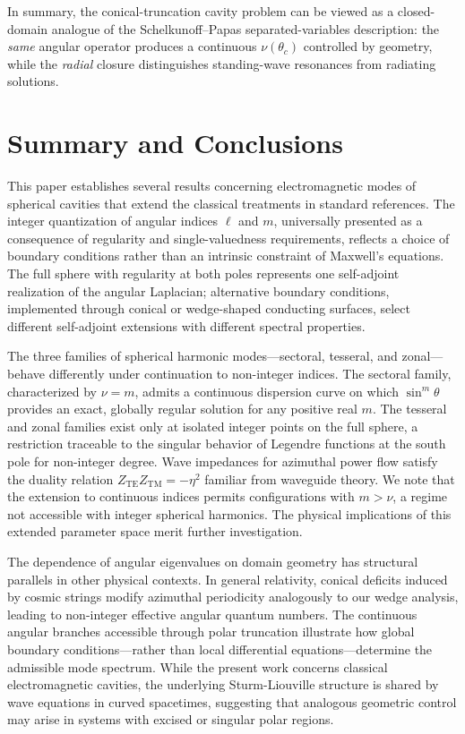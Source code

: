 \documentclass[
  aip,
  amsmath,amssymb,
  preprint
]{revtex4-1}
\begin{document}
In summary, the conical-truncation cavity problem can be viewed as a closed-domain analogue of the Schelkunoff--Papas separated-variables description: the \emph{same} angular operator produces a continuous $\nu(\theta_c)$ controlled by geometry, while the \emph{radial} closure distinguishes standing-wave resonances from radiating solutions.



\section{Summary and Conclusions}

This paper establishes several results concerning electromagnetic modes of spherical cavities that extend the classical treatments in standard references. The integer quantization of angular indices $\ell$ and $m$, universally presented as a consequence of regularity and single-valuedness requirements, reflects a choice of boundary conditions rather than an intrinsic constraint of Maxwell's equations. The full sphere with regularity at both poles represents one self-adjoint realization of the angular Laplacian; alternative boundary conditions, implemented through conical or wedge-shaped conducting surfaces, select different self-adjoint extensions with different spectral properties.

The three families of spherical harmonic modes---sectoral, tesseral, and zonal---behave differently under continuation to non-integer indices. The sectoral family, characterized by $\nu = m$, admits a continuous dispersion curve on which $\sin^m\theta$ provides an exact, globally regular solution for any positive real $m$. The tesseral and zonal families exist only at isolated integer points on the full sphere, a restriction traceable to the singular behavior of Legendre functions at the south pole for non-integer degree. Wave impedances for azimuthal power flow satisfy the duality relation $Z_{\mathrm{TE}} Z_{\mathrm{TM}}=-\eta^{2}$ familiar from waveguide theory. We note that the extension to continuous indices permits configurations with $m > \nu$, a regime not accessible with integer spherical harmonics. The physical implications of this extended parameter space merit further investigation.

The dependence of angular eigenvalues on domain geometry has structural parallels in other physical contexts. In general relativity, conical deficits induced by cosmic strings modify azimuthal periodicity analogously to our wedge analysis, leading to non-integer effective angular quantum numbers. The continuous angular branches accessible through polar truncation illustrate how global boundary conditions---rather than local differential equations---determine the admissible mode spectrum. While the present work concerns classical electromagnetic cavities, the underlying Sturm-Liouville structure is shared by wave equations in curved spacetimes, suggesting that analogous geometric control may arise in systems with excised or singular polar regions.
\end{document}
